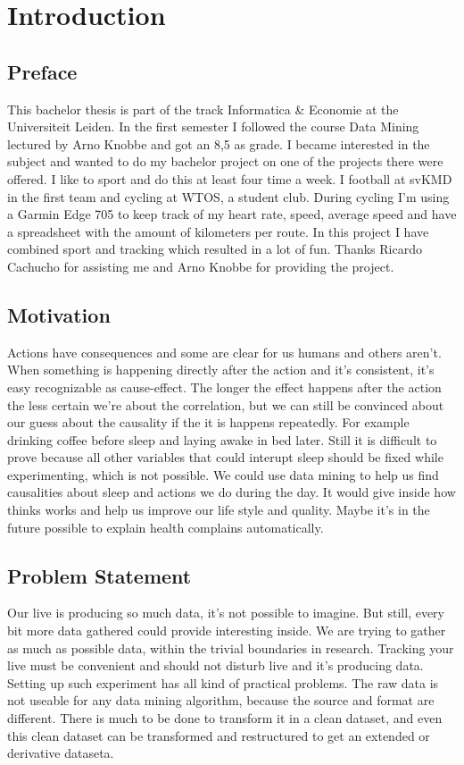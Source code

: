 \section{Introduction}
	\subsection{Preface}
		This bachelor thesis is part of the track Informatica \& Economie at the Universiteit Leiden. In the first semester I followed the course Data Mining lectured by Arno Knobbe and got an 8,5 as grade. I became interested in the subject and wanted to do my bachelor project on one of the projects there were offered. I like to sport and do this at least four time a week. I football at svKMD in the first team and cycling at WTOS, a student club. During cycling I'm using a Garmin Edge 705 to keep track of my heart rate, speed, average speed and have a spreadsheet with the amount of kilometers per route. In this project I have combined sport and tracking which resulted in a lot of fun. Thanks Ricardo Cachucho for assisting me and Arno Knobbe for providing the project.

	\subsection{Motivation}
		Actions have consequences and some are clear for us humans and others aren't. When something is happening directly after the action and it's consistent, it's easy recognizable as cause-effect. The longer the effect happens after the action the less certain we're about the correlation, but we can still be convinced about our guess about the causality if the it is happens repeatedly. For example drinking coffee before sleep and laying awake in bed later. Still it is difficult to prove because all other variables that could interupt sleep should be fixed while experimenting, which is not possible. We could use data mining to help us find causalities about sleep and actions we do during the day. It would give inside how thinks works and help us improve our life style and quality. Maybe it's in the future possible to explain health complains automatically.

	\subsection{Problem Statement}
		Our live is producing so much data, it's not possible to imagine. But still, every bit more data gathered could provide interesting inside. We are trying to gather as much as possible data, within the trivial boundaries in research. Tracking your live must be convenient and should not disturb live and it's producing data. Setting up such experiment has all kind of practical problems. The raw data is not useable for any data mining algorithm, because the source and format are different. There is much to be done to transform it in a clean dataset, and even this clean dataset can be transformed and restructured to get an extended or derivative dataseta. 

